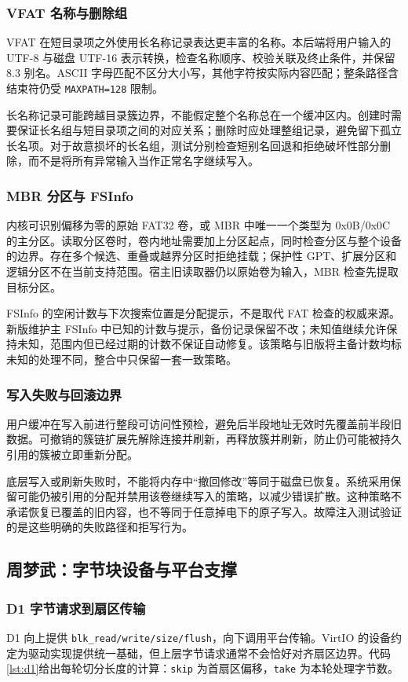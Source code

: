 \documentclass[conference]{IEEEtran}
\newcommand{\code}[1]{\texttt{#1}}
\begin{document}
\subsubsection{VFAT 名称与删除组}
VFAT 在短目录项之外使用长名称记录表达更丰富的名称。本后端将用户输入的 UTF-8 与磁盘 UTF-16 表示转换，检查名称顺序、校验关联及终止条件，并保留 8.3 别名。ASCII 字母匹配不区分大小写，其他字符按实际内容匹配；整条路径含结束符仍受 \code{MAXPATH=128} 限制。

长名称记录可能跨越目录簇边界，不能假定整个名称总在一个缓冲区内。创建时需要保证长名组与短目录项之间的对应关系；删除时应处理整组记录，避免留下孤立长名项。对于故意损坏的长名组，测试分别检查短别名回退和拒绝破坏性部分删除，而不是将所有异常输入当作正常名字继续写入。

\subsubsection{MBR 分区与 FSInfo}
内核可识别偏移为零的原始 FAT32 卷，或 MBR 中唯一一个类型为 0x0B/0x0C 的主分区。读取分区卷时，卷内地址需要加上分区起点，同时检查分区与整个设备的边界。存在多个候选、重叠或越界分区时拒绝挂载；保护性 GPT、扩展分区和逻辑分区不在当前支持范围。宿主旧读取器仍以原始卷为输入，MBR 检查先提取目标分区。

FSInfo 的空闲计数与下次搜索位置是分配提示，不是取代 FAT 检查的权威来源。新版维护主 FSInfo 中已知的计数与提示，备份记录保留不改；未知值继续允许保持未知，范围内但已经过期的计数不保证自动修复。该策略与旧版将主备计数均标未知的处理不同，整合中只保留一套一致策略。

\subsubsection{写入失败与回滚边界}
用户缓冲在写入前进行整段可访问性预检，避免后半段地址无效时先覆盖前半段旧数据。可撤销的簇链扩展先解除连接并刷新，再释放簇并刷新，防止仍可能被持久引用的簇被立即重新分配。

底层写入或刷新失败时，不能将内存中“撤回修改”等同于磁盘已恢复。系统采用保留可能仍被引用的分配并禁用该卷继续写入的策略，以减少错误扩散。这种策略不承诺恢复已覆盖的旧内容，也不等同于任意掉电下的原子写入。故障注入测试验证的是这些明确的失败路径和拒写行为。

\subsection{周梦武：字节块设备与平台支撑}
\subsubsection{D1 字节请求到扇区传输}
D1 向上提供 \code{blk\_read/write/size/flush}，向下调用平台传输。VirtIO 的设备约定为驱动实现提供统一基础，但上层字节请求通常不会恰好对齐扇区边界。代码\ref{lst:d1}给出每轮切分长度的计算：\code{skip} 为首扇区偏移，\code{take} 为本轮处理字节数。
\end{document}
